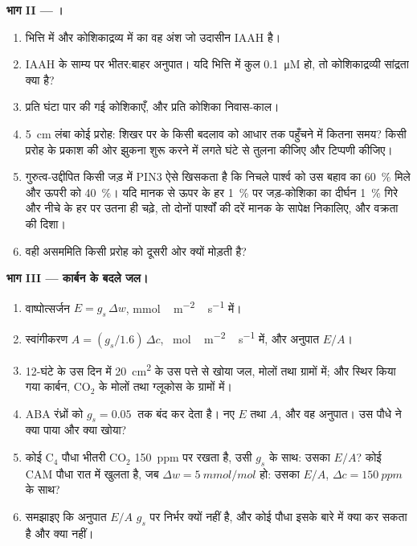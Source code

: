 \begin{problem}
\medskip
\noindent\textbf{भाग II --- ।}
\begin{enumerate}[resume]
  \item भित्ति में और कोशिकाद्रव्य में  का वह अंश जो उदासीन IAAH
        है।
  \item IAAH के साम्य पर भीतर:बाहर अनुपात। यदि भित्ति में कुल 
        \qty{0.1}{\micro M} हो, तो कोशिकाद्रव्यी सांद्रता क्या है?
  \item प्रति घंटा पार की गई कोशिकाएँ, और प्रति कोशिका निवास-काल।
  \item \qty{5}{cm} लंबा कोई प्ररोह: शिखर पर  के किसी बदलाव को
        आधार तक पहुँचने में कितना समय? किसी प्ररोह के प्रकाश की ओर
        झुकना शुरू करने में लगते घंटे से तुलना कीजिए और टिप्पणी कीजिए।
  \item गुरुत्व-उद्दीपित किसी जड़ में PIN3 ऐसे खिसकता है कि निचले
        पार्श्व को उस बहाव का \qty{60}{\%} मिले और ऊपरी को
        \qty{40}{\%}। यदि मानक से ऊपर के हर \qty{1}{\%}  पर
        जड़-कोशिका का दीर्घन \qty{1}{\%} गिरे और नीचे के हर पर उतना ही
        चढ़े, तो दोनों पार्श्वों की दरें मानक के सापेक्ष निकालिए, और
        वक्रता की दिशा।
  \item वही असममिति किसी प्ररोह को दूसरी ओर क्यों मोड़ती है?
\end{enumerate}

\medskip
\noindent\textbf{भाग III --- कार्बन के बदले जल।}
\begin{enumerate}[resume]
  \item वाष्पोत्सर्जन $E = g_{s}\,\Delta w$, \unit{mmol\,m^{-2}\,s^{-1}} में।
  \item स्वांगीकरण $A = (g_{s}/1.6)\,\Delta c$, \unit{\micro
        mol\,m^{-2}\,s^{-1}} में, और अनुपात $E/A$।
  \item 12-घंटे के उस दिन में \qty{20}{cm^2} के उस पत्ते से खोया जल,
        मोलों तथा ग्रामों में; और स्थिर किया गया कार्बन, CO$_{2}$ के
        मोलों तथा ग्लूकोस के ग्रामों में।
  \item ABA रंध्रों को $g_{s} = \qty{0.05}{}$ तक बंद कर देता है। नए
        $E$ तथा $A$, और वह अनुपात। उस पौधे ने क्या पाया और क्या खोया?
  \item कोई C$_{4}$ पौधा भीतरी CO$_{2}$ \qty{150}{ppm} पर रखता है,
        उसी $g_{s}$ के साथ: उसका $E/A$? कोई CAM पौधा रात में
        खुलता है, जब $\Delta w = \qty{5}{mmol/mol}$ हो: उसका $E/A$,
        $\Delta c =
        \qty{150}{ppm}$ के साथ?
  \item समझाइए कि अनुपात $E/A$ $g_{s}$ पर निर्भर क्यों नहीं है, और कोई
        पौधा इसके बारे में क्या कर सकता है और क्या नहीं।
\end{enumerate}


\end{problem}
